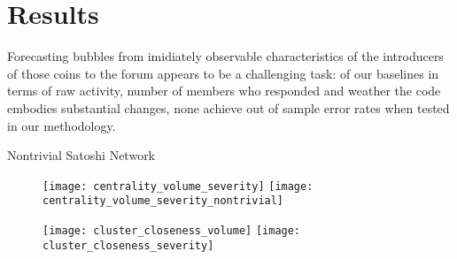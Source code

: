 \section{Results}

Forecasting bubbles from imidiately observable characteristics of the introducers of those coins to the forum appears to be a challenging task: of our baselines in terms of raw activity, number of members who responded and weather the code embodies substantial changes, none achieve out of sample error rates when tested in our methodology.

Nontrivial Satoshi Network

\begin{figure}[h]
\texttt{[image: centrality\_volume\_severity]}
\texttt{[image: centrality\_volume\_severity\_nontrivial]}
\end{figure}


\begin{figure}[h]
\texttt{[image: cluster\_closeness\_volume]}
\texttt{[image: cluster\_closeness\_severity]}
\end{figure}

